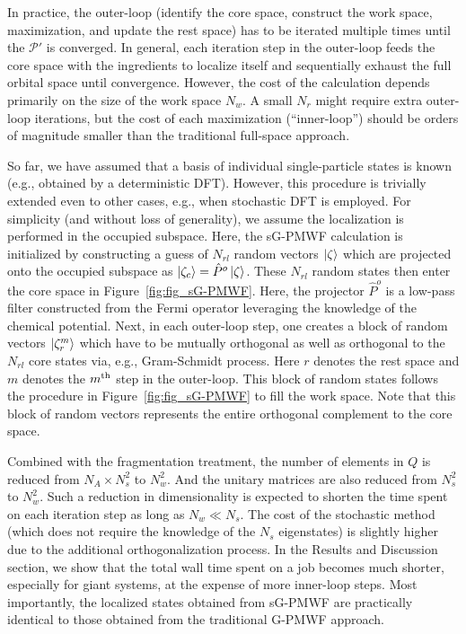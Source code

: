 \documentclass[journal=jacsat,manuscript=article]{achemso}
\begin{document}
In practice, the outer-loop (identify the core space, construct the work space, maximization, and update the rest space) has to be iterated multiple times until the $\mathcal{P}'$ is converged. In general, each iteration step in the outer-loop feeds the core space with the ingredients to localize itself and sequentially exhaust the full orbital space until convergence. However, the cost of the calculation depends primarily on the size of the work space $N_w$. A small $N_r$ might require extra outer-loop iterations, but the cost of each maximization (``inner-loop'') should be orders of magnitude smaller than the traditional full-space approach. 

So far, we have assumed that a basis of individual single-particle states is known (e.g., obtained by a deterministic DFT). However, this procedure is trivially extended even to other cases, e.g.,  when stochastic DFT is employed\cite{Baer2013,Cytter2018,Chen2019,Fabian2019,Nguyen2021,Baer2022}. For simplicity (and without loss of generality), we assume the localization is performed in the occupied subspace. Here, the sG-PMWF calculation is initialized by constructing a guess of $N_{rl}$ random vectors $\ket{\zeta}$ which are projected onto the occupied subspace as $\ket{\zeta_c} = \hat P^o \ket{\zeta}$. These $N_{rl}$ random states then enter the core space in Figure~\ref{fig:fig_sG-PMWF}. Here, the projector $\hat P^o$ is a low-pass filter constructed from the Fermi operator leveraging the knowledge of the chemical potential\cite{Baer2013,Cytter2018,Chen2019,Fabian2019,Nguyen2021,Baer2022,neuhauser2014breaking,Vlcek2018swift}. Next, in each outer-loop step, one creates a block of random vectors $\ket{\zeta_r^m}$ which have to be mutually orthogonal as well as orthogonal to the $N_{rl}$ core states via, e.g., Gram-Schmidt process. Here $r$ denotes the rest space and $m$ denotes the $m^{\rm th}$ step in the outer-loop. This block of random states follows the procedure in Figure~\ref{fig:fig_sG-PMWF} to fill the work space. Note that this block of random vectors represents the entire orthogonal complement to the core space.

Combined with the fragmentation treatment, the number of elements in $Q$ is reduced from $N_A \times N_s^2$ to $N_w^2$. And the unitary matrices are also reduced from $N_s^2$ to $N_w^2$. Such a reduction in dimensionality is expected to shorten the time spent on each iteration step as long as $N_w \ll N_s$. The cost of the stochastic method (which does not require the knowledge of the $N_s$ eigenstates) is slightly higher due to the additional orthogonalization process. In the Results and Discussion section, we show that the total wall time spent on a job becomes much shorter, especially for giant systems, at the expense of more inner-loop steps. Most importantly, the localized states obtained from sG-PMWF are practically identical to those obtained from the traditional G-PMWF approach.
\end{document}

